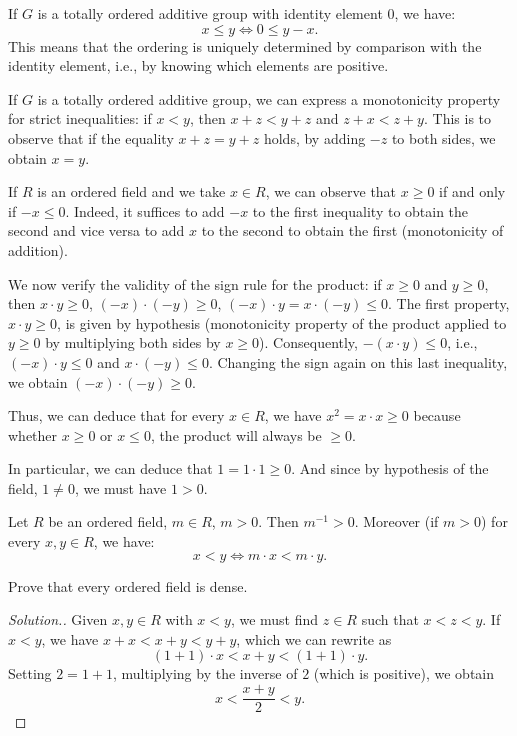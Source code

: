 If $G$ is a totally ordered additive group with identity element $0$, we have:
\[
  x\le y  \iff 0 \le y-x.
\]
This means that the ordering is uniquely determined by comparison with the
identity element, i.e., by knowing which elements are positive.

If $G$ is a totally ordered additive group, we can express a monotonicity
property for strict inequalities: if $x<y$, then $x+z<y+z$ and $z+x<z+y$. This
is to observe that if the equality $x+z=y+z$ holds, by adding $-z$ to both
sides, we obtain $x=y$.

If $R$ is an ordered field and we take $x\in R$, we can observe that $x\ge 0$ if
and only if $-x\le 0$. Indeed, it suffices to add $-x$ to the first inequality
to obtain the second and vice versa to add $x$ to the second to obtain the first
(monotonicity of addition).

We now verify the validity of the sign rule for the product: if $x\ge 0$ and
$y\ge 0$, then $x\cdot y \ge 0$, $(-x)\cdot (-y) \ge 0$, $(-x)\cdot y = x \cdot
(-y) \le 0$. The first property, $x\cdot y\ge 0$, is given by hypothesis
(monotonicity property of the product applied to $y\ge 0$ by multiplying both
sides by $x\ge 0$). Consequently, $-(x\cdot y)\le 0$, i.e., $(-x)\cdot y \le 0$
and $x\cdot (-y) \le 0$. Changing the sign again on this last inequality, we
obtain $(-x)\cdot(-y)\ge 0$.

Thus, we can deduce that for every $x\in R$, we have $x^2=x\cdot x\ge 0$ because
whether $x\ge 0$ or $x\le 0$, the product will always be $\ge 0$.

In particular, we can deduce that $1=1\cdot 1\ge 0$. And since by hypothesis of
the field, $1\neq 0$, we must have $1>0$.

\begin{exercise}
Let $R$ be an ordered field, $m\in R$, $m>0$. Then $m^{-1}>0$. Moreover (if
$m>0$) for every $x,y\in R$, we have:
\[
  x<y \iff m\cdot x < m\cdot y.
\]
\end{exercise}

\begin{exercise}
Prove that every ordered field is dense.
\end{exercise}
\begin{proof}[Solution.]
Given $x,y\in R$ with $x<y$, we must find $z\in R$ such that $x<z<y$. If $x<y$,
we have $x+x<x+y<y+y$, which we can rewrite as
\[
(1+1)\cdot x < x+y < (1+1)\cdot y.
\]
Setting $2=1+1$, multiplying by the inverse of $2$ (which is positive), we
obtain
\[
x < \frac{x+y}{2} < y.
\]
\end{proof}